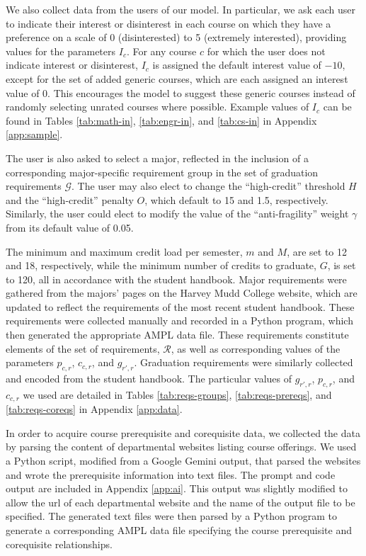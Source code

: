 \documentclass[12pt]{article}
\renewcommand{\R}{\mathcal{R}}
\newcommand{\G}{\mathcal{G}}
\begin{document}
We also collect data from the users of our model.
In particular, we ask each user to indicate their interest or disinterest in each course on which they have a preference on a scale of 0 (disinterested) to 5 (extremely interested), providing values for the parameters $I_c$.
For any course $c$ for which the user does not indicate interest or disinterest, $I_c$ is assigned the default interest value of $-10$, except for the set of added generic courses, which are each assigned an interest value of 0.
This encourages the model to suggest these generic courses instead of randomly selecting unrated courses where possible.
Example values of $I_c$ can be found in Tables \ref{tab:math-in}, \ref{tab:engr-in}, and \ref{tab:cs-in} in Appendix \ref{app:sample}.

The user is also asked to select a major, reflected in the inclusion of a corresponding major-specific requirement group in the set of graduation requirements $\G$.
The user may also elect to change the ``high-credit'' threshold $H$ and the ``high-credit'' penalty $O$, which default to 15 and 1.5, respectively.
Similarly, the user could elect to modify the value of the ``anti-fragility'' weight $\gamma$ from its default value of 0.05.

The minimum and maximum credit load per semester, $m$ and $M$, are set to 12 and 18, respectively, while the minimum number of credits to graduate, $G$, is set to 120, all in accordance with the student handbook.
Major requirements were gathered from the majors' pages on the Harvey Mudd College website, which are updated to reflect the requirements of the most recent student handbook.
These requirements were collected manually and recorded in a Python program, which then generated the appropriate AMPL data file.
These requirements constitute elements of the set of requirements, $\R$, as well as corresponding values of the parameters $p_{c,r}$, $c_{c,r}$, and $g_{r',r}$.
Graduation requirements were similarly collected and encoded from the student handbook.
The particular values of $g_{r',r}$, $p_{c,r}$, and $c_{c,r}$ we used are detailed in Tables \ref{tab:reqs-groups}, \ref{tab:reqs-prereqs}, and \ref{tab:reqs-coreqs} in Appendix \ref{app:data}.

In order to acquire course prerequisite and corequisite data, we collected the data by parsing the content of departmental websites listing course offerings. We used a Python script, modified from a Google Gemini output, that parsed the websites and wrote the prerequisite information into text files. The prompt and code output are included in Appendix \ref{app:ai}. This output was slightly modified to allow the url of each departmental website and the name of the output file to be specified. The generated text files were then parsed by a Python program to generate a corresponding AMPL data file specifying the course prerequisite and corequisite relationships.
\end{document}
